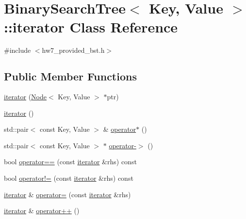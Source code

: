 \hypertarget{classBinarySearchTree_1_1iterator}{}\section{Binary\+Search\+Tree$<$ Key, Value $>$\+:\+:iterator Class Reference}
\label{classBinarySearchTree_1_1iterator}


{\ttfamily \#include $<$hw7\+\_\+provided\+\_\+bst.\+h$>$}

\subsection*{Public Member Functions}
\begin{DoxyCompactItemize}
\item 
\mbox{\hyperlink{classBinarySearchTree_1_1iterator_ad2d047d6e1fda6f9e74a568fd0539d34}{iterator}} (\mbox{\hyperlink{classNode}{Node}}$<$ Key, Value $>$ $\ast$ptr)
\item 
\mbox{\hyperlink{classBinarySearchTree_1_1iterator_aaf03ac21b275451f4d849688955d9fe8}{iterator}} ()
\item 
std\+::pair$<$ const Key, Value $>$ \& \mbox{\hyperlink{classBinarySearchTree_1_1iterator_a1863c4d0897a26ff5fb18bd05cd3184c}{operator$\ast$}} ()
\item 
std\+::pair$<$ const Key, Value $>$ $\ast$ \mbox{\hyperlink{classBinarySearchTree_1_1iterator_ad9c6b267bae9a150f05290f15e7d78fb}{operator-\/$>$}} ()
\item 
bool \mbox{\hyperlink{classBinarySearchTree_1_1iterator_a370e59842af3baf73b8e1ecfa4383781}{operator==}} (const \mbox{\hyperlink{classBinarySearchTree_1_1iterator}{iterator}} \&rhs) const
\item 
bool \mbox{\hyperlink{classBinarySearchTree_1_1iterator_aa785f43b735a4690e05d61b9d955a020}{operator!=}} (const \mbox{\hyperlink{classBinarySearchTree_1_1iterator}{iterator}} \&rhs) const
\item 
\mbox{\hyperlink{classBinarySearchTree_1_1iterator}{iterator}} \& \mbox{\hyperlink{classBinarySearchTree_1_1iterator_a02e4ae80899345cca597757cf41a803d}{operator=}} (const \mbox{\hyperlink{classBinarySearchTree_1_1iterator}{iterator}} \&rhs)
\item 
\mbox{\hyperlink{classBinarySearchTree_1_1iterator}{iterator}} \& \mbox{\hyperlink{classBinarySearchTree_1_1iterator_a9ed876ed9daa9319fa7260453c522d9c}{operator++}} ()
\end{DoxyCompactItemize}
